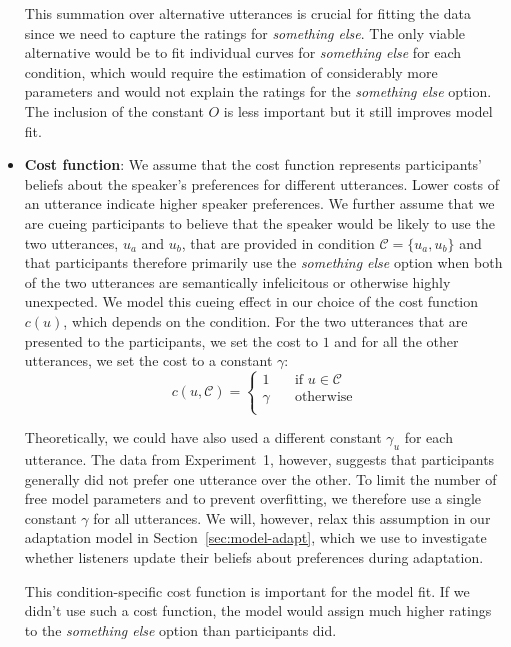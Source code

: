 \documentclass[man, floatsintext]{apa6}
\newcommand{\sectionref}[1]{Section~\ref{#1}}
\providecommand{\DIFadd}[1]{{\protect\color{blue}\uwave{#1}}} %
\providecommand{\DIFdel}[1]{{\protect\color{red}\sout{#1}}}                      %
\providecommand{\DIFaddbegin}{} %
\providecommand{\DIFaddend}{} %
\providecommand{\DIFdelbegin}{} %
\providecommand{\DIFdelend}{} %
\newcommand{\DIFscaledelfig}{0.5}
\newlength{\DIFdelgraphicswidth} %
\newlength{\DIFdelgraphicsheight} %
\newcommand{\DIFaddincludegraphics}[2][]{{\color{blue}\fbox{\DIFOincludegraphics[#1]{#2}}}} %
\newcommand{\DIFdelincludegraphics}[2][]{%
\sbox{\DIFdelgraphicsbox}{\DIFOincludegraphics[#1]{#2}}%
\settoboxwidth{\DIFdelgraphicswidth}{\DIFdelgraphicsbox} %
\settoboxtotalheight{\DIFdelgraphicsheight}{\DIFdelgraphicsbox} %
\scalebox{\DIFscaledelfig}{%
\parbox[b]{\DIFdelgraphicswidth}{\usebox{\DIFdelgraphicsbox}\\[-\baselineskip] \rule{\DIFdelgraphicswidth}{0em}}\llap{\resizebox{\DIFdelgraphicswidth}{\DIFdelgraphicsheight}{%
\setlength{\unitlength}{\DIFdelgraphicswidth}%
\begin{picture}(1,1)%
\thicklines\linethickness{2pt} %
{\color[rgb]{1,0,0}\put(0,0){\framebox(1,1){}}}%
{\color[rgb]{1,0,0}\put(0,0){\line( 1,1){1}}}%
{\color[rgb]{1,0,0}\put(0,1){\line(1,-1){1}}}%
\end{picture}%
}\hspace*{3pt}}} %
} %
\DeclareRobustCommand{\DIFaddbegin}{\DIFOaddbegin \let\includegraphics\DIFaddincludegraphics} %
\DeclareRobustCommand{\DIFaddend}{\DIFOaddend \let\includegraphics\DIFOincludegraphics} %
\DeclareRobustCommand{\DIFdelbegin}{\DIFOdelbegin \let\includegraphics\DIFdelincludegraphics} %
\DeclareRobustCommand{\DIFdelend}{\DIFOaddend \let\includegraphics\DIFOincludegraphics} %
\begin{document}
\begin{itemize}
This summation over alternative utterances is crucial for fitting the data since we need to
capture the ratings for \textit{something else}. The only viable alternative would be
to fit individual curves for \textit{something else} for each condition, which would require
the estimation of considerably more parameters and would not explain the ratings for the
\textit{something else} option. The inclusion of the constant $O$ is less important but it
still improves model fit.


\item \textbf{Cost function}: We assume that the cost function represents participants' beliefs about the speaker's 
preferences for different utterances. Lower costs of an utterance indicate higher speaker preferences. We further 
assume that we are cueing participants to believe that the speaker would be likely to use the two utterances, $u_a$ 
and $u_b$, that are provided in condition $\mathscr{C}=\{u_a, u_b\}$ and that participants therefore primarily use the 
\textit{something else} option when both of the two utterances are semantically infelicitous or otherwise highly unexpected. 
We model this cueing effect in our choice of the cost function $c(u)$, which depends on the condition. For the two utterances 
that are presented to the participants, we set the cost to $1$ and for all the other utterances, we set the cost to a constant \DIFdelbegin \DIFdel{$\gamma$}\DIFdelend \DIFaddbegin \DIFadd{$\gamma > 1$}\DIFaddend :
$$
c(u, \mathscr{C}) = 
     \begin{cases}
       1 &\quad\text{if } u  \in \mathscr{C}\\
       \gamma &\quad\text{otherwise} \\
     \end{cases}
$$

Theoretically, we could have also used a different constant $\gamma_u$ for each utterance. The data from
Experiment~1, however, suggests that participants generally did not prefer one utterance over 
the other. To limit the number of free model parameters and to prevent overfitting, we therefore use a single
constant $\gamma$ for all utterances. We will, however, relax this assumption in our adaptation model in \sectionref{sec:model-adapt}, which
we use to investigate whether listeners update their beliefs about preferences during adaptation.

This condition-specific cost function is important for the model fit. If we didn't use such a cost function, 
the model would assign much higher ratings to the \textit{something else} option than participants did.


\end{itemize}
\end{document}
